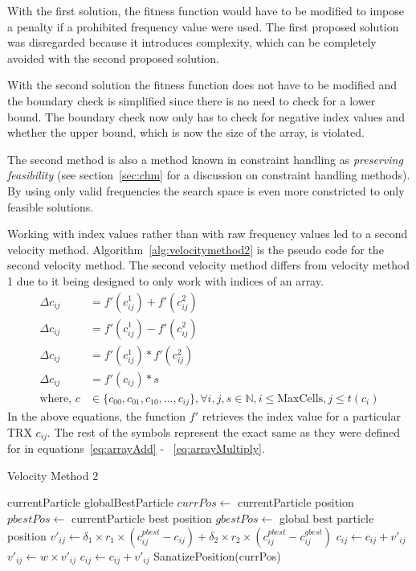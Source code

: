 With the first solution, the fitness function would have to be modified to impose a penalty if a prohibited frequency value were used. The first proposed solution was disregarded because it introduces complexity, which can be completely avoided with the second proposed solution.

With the second solution the fitness function does not have to be modified and the boundary check is simplified since there is no need to check for a lower bound. The boundary check now only has to check for negative index values and whether the upper bound, which is now the size of the array, is violated. 

The second method is also a method known in constraint handling as \emph{preserving feasibility} (see section~\ref{sec:chm} for a discussion on constraint handling methods). By using only valid frequencies the search space is even more constricted to only feasible solutions.


Working with index values rather than with raw frequency values led to  a second velocity method. Algorithm~\ref{alg:velocitymethod2} is the pseudo code for the second velocity method. The second velocity method differs from velocity method 1 due to it being designed to only work with indices of an array.
\begin{align}
    \Delta c_{ij} &= f'(c^1_{ij}) + f'(c^2_{ij})\label{eq:arrayAdd2}\\
    \Delta c_{ij} &= f'(c^1_{ij}) - f'(c^2_{ij})\label{eq:arraySubtract2}\\
	\Delta c_{ij} &= f'(c^1_{ij}) * f'(c^2_{ij})\label{eq:arrayMultiply2}\\
    \Delta c_{ij} &= f'(c_{ij}) * s \label{eq:arrayScalar2}\\
    \text{where, }c &\in \{c_{00},c_{01},c_{10}, \dots, c_{ij}\} , \forall i,j,s \in \mathbb{N}, i \leq \text{MaxCells}, j \leq t(c_i)\nonumber
\end{align}
In the above equations, the function $f'$ retrieves the index value for a particular TRX $c_{ij}$. The rest of the symbols represent the exact same as they were defined for in equations~\ref{eq:arrayAdd} - ~\ref{eq:arrayMultiply}.
\begin{algorithm}[H]
\caption{Velocity Method 2}
\label{alg:velocitymethod2}
\begin{algorithmic}[1]
	\Require currentParticle
	\Require globalBestParticle
	\State $currPos \leftarrow$ currentParticle position
	\State $pbestPos \leftarrow$ currentParticle best position
	\State $gbestPos \leftarrow$ global best particle position
		\State $v'_{ij} \leftarrow \delta_1 \times r_1 \times (c^{pbest}_{ij} - c_{ij}) + \delta_2 \times r_2 \times (c^{pbest}_{ij} - c^{gbest}_{ij})$
			\State $c_{ij} \leftarrow c_{ij} + v'_{ij}$
		\Else
			\State $v'_{ij} \leftarrow w \times v'_{ij}$
			\State $c_{ij} \leftarrow c_{ij} + v'_{ij}$
		\EndIf
	\EndFor
	\State SanatizePosition(currPos)
\end{algorithmic}
\end{algorithm}


